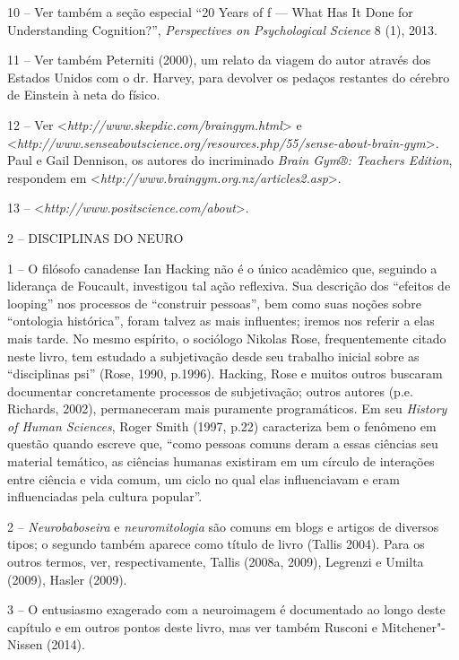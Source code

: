 10 -- Ver também a seção especial ``20 Years of f --- What Has It
Done for Understanding Cognition?'', \emph{Perspectives on Psychological
Science} 8 (1), 2013.

11 -- Ver também Peterniti (2000), um relato da viagem do autor através
dos Estados Unidos com o dr. Harvey, para devolver os pedaços restantes
do cérebro de Einstein à neta do físico.

12 -- Ver \textless{}\emph{http://www.skepdic.com/braingym.html}\textgreater{} e
\textless{}\emph{http://www.senseaboutscience.org/resources.php/55/sense-about-brain-gym}\textgreater{}.
Paul e Gail Dennison, os autores do incriminado \emph{Brain Gym®:
Teachers Edition}, respondem em
\textless{}\emph{http://www.braingym.org.nz/articles2.asp}\textgreater{}.

13 -- \textless{}\emph{http://www.positscience.com/about}\textgreater{}.

2 -- DISCIPLINAS DO NEURO

1 -- O filósofo canadense Ian Hacking não é o único acadêmico que,
seguindo a liderança de Foucault, investigou tal ação reflexiva. Sua
descrição dos ``efeitos de looping'' nos processos de ``construir
pessoas'', bem como suas noções sobre ``ontologia histórica'', foram
talvez as mais influentes; iremos nos referir a elas mais tarde. No
mesmo espírito, o sociólogo Nikolas Rose, frequentemente citado neste
livro, tem estudado a subjetivação desde seu trabalho inicial sobre as
``disciplinas psi'' (Rose, 1990, p.1996). Hacking, Rose e muitos outros
buscaram documentar concretamente processos de subjetivação; outros
autores (p.e. Richards, 2002), permaneceram mais puramente
programáticos. Em seu \emph{History of Human Sciences}, Roger Smith
(1997, p.22) caracteriza bem o fenômeno em questão quando escreve que,
``como pessoas comuns deram a essas ciências seu material temático, as
ciências humanas existiram em um círculo de interações entre ciência e
vida comum, um ciclo no qual elas influenciavam e eram influenciadas
pela cultura popular''.

2 -- \emph{Neurobaboseira} e \emph{neuromitologia} são comuns em blogs e
artigos de diversos tipos; o segundo também aparece como título de livro
(Tallis 2004). Para os outros termos, ver, respectivamente, Tallis
(2008a, 2009), Legrenzi e Umilta (2009), Hasler (2009).

3 -- O entusiasmo exagerado com a neuroimagem é documentado ao longo
deste capítulo e em outros pontos deste livro, mas ver também Rusconi e
Mitchener"-Nissen (2014).

